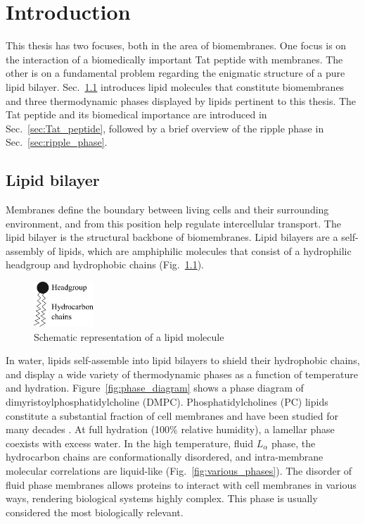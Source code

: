 \chapter{Introduction}
This thesis has two focuses, both in the area of biomembranes.
One focus is on the interaction of a biomedically important Tat peptide with 
membranes.
The other is on a fundamental problem regarding the enigmatic structure of a
pure lipid bilayer.
Sec.~\ref{sec:lipid_bilayer} introduces lipid molecules that constitute
biomembranes and three thermodynamic phases displayed by lipids pertinent to this 
thesis.
The Tat peptide and its biomedical importance are introduced in Sec.~\ref{sec:Tat_peptide},
followed by a brief overview of the ripple phase in Sec.~\ref{sec:ripple_phase}.


\section{Lipid bilayer}\label{sec:lipid_bilayer}
Membranes define the boundary between living cells
and their surrounding environment, and from this position help 
regulate intercellular transport. 
The lipid bilayer is the structural backbone of biomembranes.
Lipid bilayers are a self-assembly of lipids, which are 
amphiphilic molecules that consist of a hydrophilic headgroup
and hydrophobic chains (Fig.~\ref{fig:lipid}).

\begin{figure}
  \centering
  \includegraphics[width=0.2\textwidth]{figures/lipid}
  \caption{Schematic representation of a lipid molecule}
  \label{fig:lipid}
\end{figure}

In water, lipids self-assemble into lipid bilayers to shield their hydrophobic 
chains, and display a wide variety of thermodynamic phases
as a function of temperature and hydration. Figure~\ref{fig:phase_diagram}
shows a phase diagram of dimyristoylphosphatidylcholine (\gls{DMPC}).
Phosphatidylcholines (\gls{PC}) lipids constitute a substantial fraction of cell membranes
and have been studied for many decades \cite{Nagle00}.
At full hydration (100\% relative humidity), a lamellar phase coexists with excess water.
In the high temperature, fluid $L_\alpha$ phase, the hydrocarbon chains 
are conformationally disordered, and intra-membrane molecular correlations 
are liquid-like \cite{ref:Fahey78} (Fig.~\ref{fig:various_phases}).
The disorder of fluid phase membranes allows proteins to 
interact with cell membranes in various ways, rendering biological systems
highly complex. 
This phase is usually considered the most biologically relevant.

